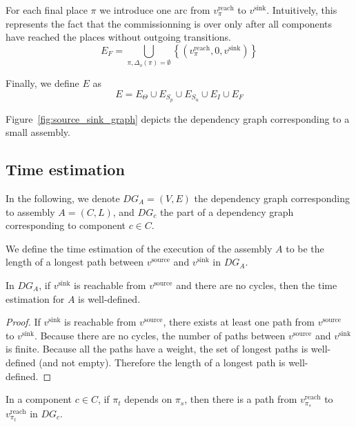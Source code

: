 For each final place $\pi$ we introduce one arc from $v_\pi^\text{reach}$
to $v^\text{sink}$. Intuitively, this represents the fact that the
commissionning is over only after all components have reached the
places without outgoing transitions.
\[
E_F=\bigcup_{\pi, \Delta_o(\pi) = \emptyset}\left\{ \left(v_\pi^\text{reach},0,v^\text{sink}\right)\right\} 
\]

Finally, we define $E$ as 
\[
E= E_{\Theta} \cup E_{S_p}\cup E_{S_u}\cup E_{I}\cup E_{F}
\]

Figure~\ref{fig:source_sink_graph} depicts the dependency graph
corresponding to a small assembly.


\subsection{Time estimation}

In the following, we denote $DG_A=(V,E)$ the dependency graph corresponding
to assembly $A=(C,L)$, and $DG_c$ the part of a dependency graph
corresponding to component $c \in C$.

We define the time estimation of the execution of the \mad assembly $A$
to be the length of a longest path between $v^\text{source}$ and
$v^\text{sink}$ in $DG_A$.

\begin{lemma}
 In $DG_A$, if $v^\text{sink}$ is reachable from $v^\text{source}$ and there
 are no cycles, then the time estimation for $A$ is well-defined.
 \label{lemma:well_defined}
\end{lemma}

\begin{proof}
 If $v^\text{sink}$ is reachable from $v^\text{source}$, there exists at least
 one path from $v^\text{source}$ to  $v^\text{sink}$. Because there are no
 cycles, the number of paths between $v^\text{source}$ and $v^\text{sink}$ is
 finite. Because all the paths have a weight, the set of longest paths is
 well-defined (and not empty). Therefore the length of a longest path is
 well-defined.
\end{proof}

\begin{lemma}\label{lemma:reachable}
 In a component $c \in C$, if $\pi_t$ depends on $\pi_s$, then there
 is a path from $v_{\pi_s}^\text{reach}$ to $v_{\pi_t}^\text{reach}$ in $DG_c$.
\end{lemma}

